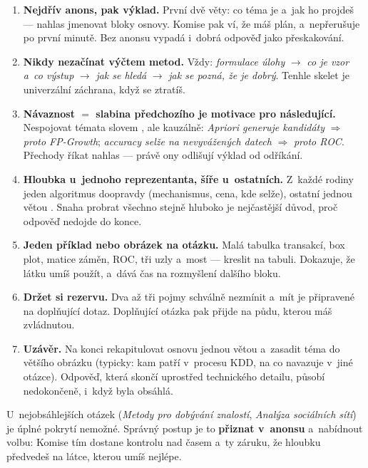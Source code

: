 \documentclass[11pt,a4paper]{article}
\begin{document}
\begin{enumerate}[label=\arabic*.,leftmargin=1.8em]
\item \textbf{Nejdřív anons, pak výklad.} První dvě věty: co téma je a~jak ho projdeš ---
      nahlas jmenovat bloky osnovy. Komise pak ví, že máš plán, a~nepřerušuje po první
      minutě. Bez anonsu vypadá i~dobrá odpověď jako přeskakování.
\item \textbf{Nikdy nezačínat výčtem metod.} Vždy: \emph{formulace úlohy} $\to$
      \emph{co je vzor a~co výstup} $\to$ \emph{jak se hledá} $\to$ \emph{jak se pozná, že
      je dobrý}. Tenhle skelet je univerzální záchrana, když se ztratíš.
\item \textbf{Návaznost $=$ slabina předchozího je motivace pro následující.} Nespojovat
      témata slovem , ale kauzálně: \emph{Apriori generuje kandidáty} $\Rightarrow$
      \emph{proto FP-Growth}; \emph{accuracy selže na nevyvážených datech} $\Rightarrow$
      \emph{proto ROC}. Přechody říkat nahlas --- právě ony odlišují výklad od odříkání.
\item \textbf{Hloubka u~jednoho reprezentanta, šíře u~ostatních.} Z~každé rodiny jeden
      algoritmus doopravdy (mechanismus, cena, kde selže), ostatní jednou větou . Snaha probrat všechno stejně hluboko je nejčastější důvod, proč
      odpověď nedojde do konce.
\item \textbf{Jeden příklad nebo obrázek na otázku.} Malá tabulka transakcí, box plot,
      matice záměn, ROC, tři uzly a~most --- kreslit na tabuli. Dokazuje, že látku umíš
      použít, a~dává čas na rozmyšlení dalšího bloku.
\item \textbf{Držet si rezervu.} Dva až tři pojmy schválně nezmínit a~mít je připravené na
      doplňující dotaz. Doplňující otázka pak přijde na půdu, kterou máš zvládnutou.
\item \textbf{Uzávěr.} Na konci rekapitulovat osnovu jednou větou a~zasadit téma do většího
      obrázku (typicky: kam patří v~procesu KDD, na co navazuje v~jiné otázce). Odpověď,
      která skončí uprostřed technického detailu, působí nedokončeně, i~když byla obsáhlá.
\end{enumerate}

\begin{poznbox}
\small
U~nejobsáhlejších otázek (\emph{Metody pro dobývání znalostí}, \emph{Analýza sociálních
sítí}) je úplné pokrytí nemožné. Správný postup je to \textbf{přiznat v~anonsu} a~nabídnout
volbu:  Komise tím
dostane kontrolu nad časem a~ty záruku, že hloubku předvedeš na látce, kterou umíš nejlépe.
\end{poznbox}
\end{document}
